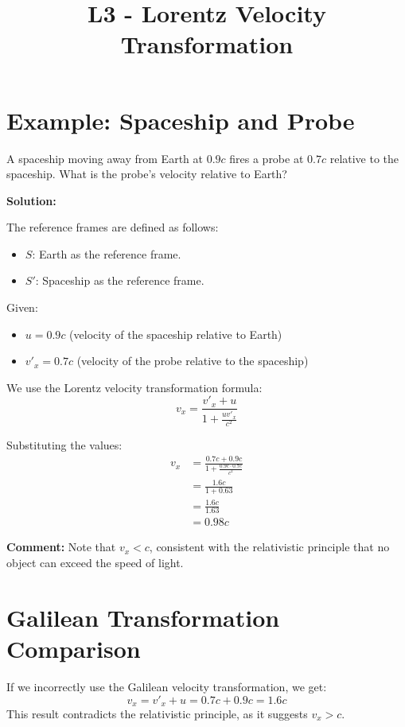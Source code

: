 \documentclass[a4paper,12pt]{article}
\begin{document}
\title{L3 - Lorentz Velocity Transformation}
\author{}
\date{}
\maketitle

\begin{multicols}{2}

\section*{Example: Spaceship and Probe}
A spaceship moving away from Earth at $0.9c$ fires a probe at $0.7c$ relative to the spaceship. What is the probe's velocity relative to Earth?

\textbf{Solution:}

The reference frames are defined as follows:
\begin{itemize}
  \item $S$: Earth as the reference frame.
  \item $S'$: Spaceship as the reference frame.
\end{itemize}

Given:

\begin{itemize}
  \item $u = 0.9c$ (velocity of the spaceship relative to Earth)
  \item $v'_x = 0.7c$ (velocity of the probe relative to the spaceship)
\end{itemize}


We use the Lorentz velocity transformation formula:
\begin{equation}
  v_x = \frac{v'_x + u}{1 + \frac{u v'_x}{c^2}}
\end{equation}

Substituting the values:
\begin{align*}
  v_x &= \frac{0.7c + 0.9c}{1 + \frac{0.9c \cdot 0.7c}{c^2}} \\
      &= \frac{1.6c}{1 + 0.63} \\
      &= \frac{1.6c}{1.63} \\
      &= 0.98c
\end{align*}

\textbf{Comment:} Note that $v_x < c$, consistent with the relativistic principle that no object can exceed the speed of light.

\section*{Galilean Transformation Comparison}
If we incorrectly use the Galilean velocity transformation, we get:
\begin{equation}
  v_x = v'_x + u = 0.7c + 0.9c = 1.6c
\end{equation}
This result contradicts the relativistic principle, as it suggests $v_x > c$.


\end{multicols}
\end{document}
